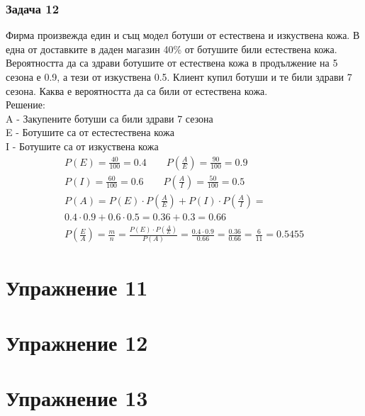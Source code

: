 \documentclass[fleqn, 12pt]{article}
\theoremstyle{definition}
\begin{document}
\subsubsection*{Задача 12}
Фирма произвежда един и същ модел ботуши от естествена и изкуствена кожа. 
В една от доставките в даден магазин 40\% от ботушите били естествена кожа.
Вероятността да са здрави ботушите от естествена кожа в продължение на 5 сезона е 0.9, а тези от изкуствена 0.5.
Клиент купил ботуши и те били здрави 7 сезона.
Каква е вероятността да са били от естествена кожа. \\
Решение: \\
A - Закупените ботуши са били здрави 7 сезона \\
E - Ботушите са от естестествена кожа \\
I - Ботушите са от изкуствена кожа\\
\begin{gather*}
P(E) = \frac{40}{100} = 0.4 \qquad P \left( \frac{A}{E} \right) = \frac{90}{100} = 0.9 \\
P(I) = \frac{60}{100} = 0.6 \qquad P \left( \frac{A}{I} \right) = \frac{50}{100} = 0.5 \\
P(A) = P(E) \cdot  P \left( \frac{A}{E} \right) + P(I) \cdot  P \left( \frac{A}{I} \right) = \\
0.4 \cdot 0.9 + 0.6 \cdot 0.5 = 0.36 +0.3 = 0.66 \\
P \left( \frac{E}{A} \right) = \frac{m}{n} = \frac{ P(E) \cdot P \left( \frac{A}{E} \right)}{P(A)} = \frac{0.4 \cdot 0.9}{0.66} = \frac{0.36}{0.66} = \frac{6}{11} = 0.5455 
\end{gather*}



\newpage
\section{ Упражнение 11}

\newpage
\section{ Упражнение 12}

\newpage
\section{ Упражнение 13}
\end{document}
